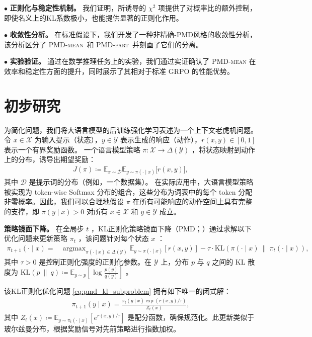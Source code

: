 \documentclass{article}
\theoremstyle{plain}
\theoremstyle{definition}
\theoremstyle{remark}
\DeclareMathOperator*{\argmax}{argmax}
\begin{document}
$\bullet$  \textbf{正则化与稳定性机制。} 我们证明，所诱导的 $\chi^2$  项提供了对概率比的额外控制，即使名义上的KL系数极小，也能提供显著的正则化作用。

$\bullet$  \textbf{收敛性分析。} 在标准假设下，我们开发了一种非精确-PMD风格的收敛性分析，该分析区分了 \textsc{PMD-mean}\ 和 \textsc{PMD-part}\ 并刻画了它们的分离。

$\bullet$  \textbf{实验验证。} 通过在数学推理任务上的实验，我们通过实证确认了 \textsc{PMD-mean} 在效率和稳定性方面的提升，同时展示了其相对于标准 GRPO 的性能优势。


\section{初步研究}
\label{sec:prelim}

为简化问题，我们将大语言模型的后训练强化学习表述为一个上下文老虎机问题。令 $x\in\mathcal{X}$ 为输入提示（状态），$y\in\mathcal{Y}$ 表示生成的响应（动作），$r(x,y)\in[0,1]$ 表示一个有界奖励函数。  
一个语言模型策略 $\pi\colon\mathcal{X}\to\Delta(\mathcal{Y})$ ，将状态映射到动作上的分布，诱导出期望奖励：
\begin{align*}
    J(\pi) \coloneqq \mathbb{E}_{x\sim\mathcal{D}} \mathbb{E}_{y\sim \pi(\cdot\mid x)} \big[r(x,y)\big],
\end{align*}
其中 $\mathcal{D}$ 是提示词的分布（例如，一个数据集）。  
在实际应用中，大语言模型策略被实现为 token-wise Softmax 分布的组合，这些分布为词表中的每个 token 分配非零概率。因此，我们可以合理地假设 $\pi$ 在所有可能响应的动作空间上具有完整的支撑，即 $\pi(y\mid x)>0$ 对所有 $x\in\mathcal{X}$ 和 $y\in\mathcal{Y}$ 成立。


\textbf{策略镜面下降。} 
在全局步 $t$ ，KL正则化策略镜面下降（PMD；\citealt{geist2019theory,tomarmirror}）通过求解以下优化问题来更新策略 $\pi_t$ ，该问题针对每个状态 $x$ ：
\begin{align}
    \pi_{t+1}(\cdot\mid x) = 
    &\argmax_{\pi(\cdot\mid x)\in \Delta(\mathcal{Y})}
    \mathbb{E}_{y\sim \pi(\cdot\mid x)}[r(x,y)]-
    \tau\cdot\text{KL}\left(\pi(\cdot\mid x)~\|~\pi_t(\cdot\mid x)\right),
    \label{eq:pmd_kl_subproblem}
\end{align}
其中 $\tau>0$ 是控制正则化强度的正则化参数。在 $\mathcal{Y}$ 上，分布 $p$ 与 $q$ 之间的 KL 散度为 $\text{KL}(p~\|~q)\coloneqq\mathbb{E}_{y\sim p}\left[\log\frac{p(y)}{q(y)}\right]$ 。

该KL正则化优化问题 \eqref{eq:pmd_kl_subproblem} 拥有如下唯一的闭式解：
\begin{align}
    \pi_{t+1}(y\mid x)
    =\frac{\pi_t(y\mid x)\exp(r(x,y)/\tau)}{Z_t(x)},
    \label{eq:boltzmann_update}
\end{align}
其中 $Z_t(x)\coloneqq \mathbb{E}_{y\sim \pi_t(\cdot\mid x)}\left[e^{r(x,y)/\tau}\right]$ 是配分函数，确保规范化。此更新类似于玻尔兹曼分布，根据奖励信号对先前策略进行指数加权。
\end{document}

